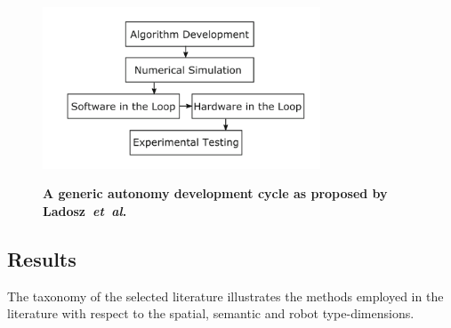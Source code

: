 \documentclass[twocolumn,letterpaper]{IEEEAerospaceCLS}  %
\newcommand{\abbreviation}[1]{\emph{#1}.}
\newcommand{\etal}{\abbreviation{et~al}}
\begin{document}
\begin{figure}[t]
    \centering
    \includegraphics[width=3.25in]{2-3DevelopmentCycle.png}\\
    \caption{\bf{A generic autonomy development cycle as proposed by Ladosz~\etal~\protect\cite{ladosz_generic_2019}}}
    \label{fig:DevProcess}
\end{figure}

\subsection{Results} \label{ssec:LitRes}
The taxonomy of the selected literature illustrates the methods employed in the literature with respect to the spatial, semantic and robot type-dimensions.
\end{document}
